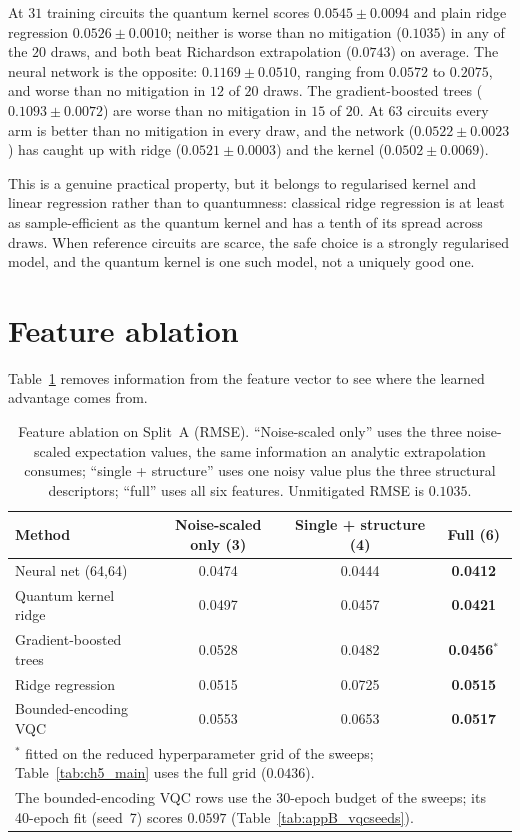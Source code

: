 \documentclass[Thesis.tex]{subfiles}
\begin{document}
At $31$ training circuits the quantum kernel scores $0.0545 \pm 0.0094$ and plain
ridge regression $0.0526 \pm 0.0010$; neither is worse than no mitigation ($0.1035$)
in any of the $20$ draws, and both beat Richardson extrapolation ($0.0743$) on
average. The neural network is the opposite: $0.1169 \pm 0.0510$, ranging from
$0.0572$ to $0.2075$, and worse than no mitigation in $12$ of $20$ draws. The
gradient-boosted trees ($0.1093 \pm 0.0072$) are worse than no mitigation in $15$
of $20$. At $63$ circuits every arm is better than no mitigation in every draw, and
the network ($0.0522 \pm 0.0023$) has caught up with ridge ($0.0521 \pm 0.0003$)
and the kernel ($0.0502 \pm 0.0069$).

This is a genuine practical property, but it belongs to regularised kernel and linear
regression rather than to quantumness: classical ridge regression is at least as
sample-efficient as the quantum kernel and has a tenth of its spread across draws.
When reference circuits are scarce, the safe choice is a strongly regularised model,
and the quantum kernel is one such model, not a uniquely good one.

\section{Feature ablation}\label{sec:ch5_ablation}

Table~\ref{tab:ch5_ablation} removes information from the feature vector to see where
the learned advantage comes from.

\begin{table}[htbp]
\centering
\caption[Feature ablation on Split~A]{Feature ablation on Split~A (RMSE). ``Noise-scaled only'' uses the three
noise-scaled expectation values, the same information an analytic extrapolation
consumes; ``single + structure'' uses one noisy value plus the three structural
descriptors; ``full'' uses all six features. Unmitigated RMSE is $0.1035$.}
\label{tab:ch5_ablation}
\small
\begin{tabular}{lccc}
\toprule
\textbf{Method} & \textbf{Noise-scaled only (3)} & \textbf{Single + structure (4)}
& \textbf{Full (6)} \\
\midrule
Neural net (64,64)     & 0.0474 & 0.0444 & \textbf{0.0412} \\
Quantum kernel ridge   & 0.0497 & 0.0457 & \textbf{0.0421} \\
Gradient-boosted trees & 0.0528 & 0.0482 & \textbf{0.0456}$^{*}$ \\
Ridge regression       & 0.0515 & 0.0725 & \textbf{0.0515} \\
Bounded-encoding VQC   & 0.0553 & 0.0653 & \textbf{0.0517} \\
\bottomrule
\multicolumn{4}{l}{\footnotesize $^{*}$ fitted on the reduced hyperparameter grid of the
sweeps; Table~\ref{tab:ch5_main} uses the full grid ($0.0436$).}\\
\multicolumn{4}{l}{\footnotesize The bounded-encoding VQC rows use the 30-epoch budget of
the sweeps; its 40-epoch fit (seed~7) scores $0.0597$ (Table~\ref{tab:appB_vqcseeds}).}
\end{tabular}
\end{table}
\end{document}
